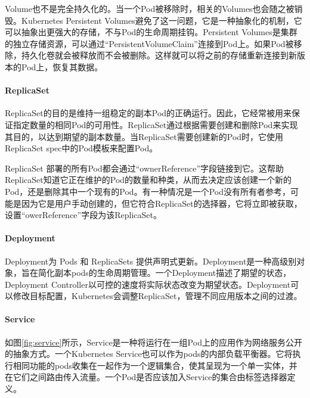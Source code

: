 \documentclass[macfonts,master]{njuthesis}
\begin{document}
Volume也不是完全持久化的。当一个Pod被移除时，相关的Volumes也会随之被销毁。Kubernetes Persistent Volumes避免了这一问题，它是一种抽象化的机制，它可以抽象出更强大的存储，不与Pod的生命周期挂钩\cite{k8sconcepts}。Persistent Volumes是集群的独立存储资源，可以通过“PersistentVolumeClaim”连接到Pod上。如果Pod被移除，持久化卷就会被释放而不会被删除。这样就可以将之前的存储重新连接到新版本的Pod上，恢复其数据。

\paragraph{ReplicaSet}
ReplicaSet的目的是维持一组稳定的副本Pod的正确运行。因此，它经常被用来保证指定数量的相同Pod的可用性\cite{k8sconcepts}。ReplicaSet通过根据需要创建和删除Pod来实现其目的，以达到期望的副本数量。当ReplicaSet需要创建新的Pod时，它使用ReplicaSet spec中的Pod模板来配置Pod。

ReplicaSet 部署的所有Pod都会通过“ownerReference”字段链接到它。这帮助ReplicaSet知道它正在维护的Pod的数量和种类，从而去决定应该创建一个新的Pod，还是删除其中一个现有的Pod。有一种情况是一个Pod没有所有者参考，可能是因为它是用户手动创建的，但它符合ReplicaSet的选择器，它将立即被获取，设置“owerReference”字段为该ReplicaSet。

\paragraph{Deployment}
Deployment为 Pods 和 ReplicaSets 提供声明式更新\cite{k8sconcepts}。Deployment是一种高级别对象，旨在简化副本pods的生命周期管理。一个Deployment描述了期望的状态，Deployment Controller以可控的速度将实际状态改变为期望状态。Deployment可以修改目标配置，Kubernetes会调整ReplicaSet，管理不同应用版本之间的过渡。

\paragraph{Service}
如图\ref{fig:service}所示，Service是一种将运行在一组Pod上的应用作为网络服务公开的抽象方式\cite{k8sconcepts}。一个Kubernetes Service也可以作为pods的内部负载平衡器。它将执行相同功能的pods收集在一起作为一个逻辑集合，使其呈现为一个单一实体，并在它们之间路由传入流量。一个Pod是否应该加入Service的集合由标签选择器定义。
\end{document}
